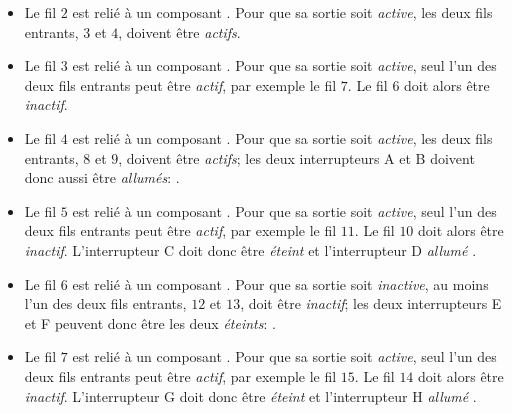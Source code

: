 \documentclass[a4paper,11pt]{report}
\newcommand{\taskGraphicsFolder}{..}
\begin{document}
\begin{itemize}
  \item Le fil $2$ est relié à un composant \raisebox{\dimexpr -0.5ex -0.6ex \relax}{}. Pour que sa sortie soit \emph{active}, les deux fils entrants, $3$ et $4$, doivent être \emph{actifs}.
  \item Le fil $3$ est relié à un composant \raisebox{\dimexpr -0.5ex -0.6ex \relax}{}. Pour que sa sortie soit \emph{active}, seul l’un des deux fils entrants peut être \emph{actif}, par exemple le fil $7$. Le fil $6$ doit alors être \emph{inactif}.
  \item Le fil $4$ est relié à un composant \raisebox{\dimexpr -0.5ex -0.6ex \relax}{}. Pour que sa sortie soit \emph{active}, les deux fils entrants, $8$ et $9$, doivent être \emph{actifs}; les deux interrupteurs A et B doivent donc aussi être \emph{allumés}: \raisebox{-0.5ex}{}.
  \item Le fil $5$ est relié à un composant \raisebox{\dimexpr -0.5ex -0.6ex \relax}{}. Pour que sa sortie soit \emph{active}, seul l’un des deux fils entrants peut être \emph{actif}, par exemple le fil $11$. Le fil $10$ doit alors être \emph{inactif}. L’interrupteur C doit donc être \emph{éteint} \raisebox{-0.5ex}{} et l’interrupteur D \emph{allumé} \raisebox{-0.5ex}{}.
  \item Le fil $6$ est relié à un composant \raisebox{\dimexpr -0.5ex -0.6ex \relax}{}. Pour que sa sortie soit \emph{inactive}, au moins l’un des deux fils entrants, $12$ et $13$, doit être \emph{inactif}; les deux interrupteurs E et F peuvent donc être les deux \emph{éteints}: \raisebox{-0.5ex}{}.
  \item Le fil $7$ est relié à un composant \raisebox{\dimexpr -0.5ex -0.6ex \relax}{}. Pour que sa sortie soit \emph{active}, seul l’un des deux fils entrants peut être \emph{actif}, par exemple le fil $15$. Le fil $14$ doit alors être \emph{inactif}. L’interrupteur G doit donc être \emph{éteint} \raisebox{-0.5ex}{} et l’interrupteur H \emph{allumé} \raisebox{-0.5ex}{}.
\end{itemize}
\end{document}
